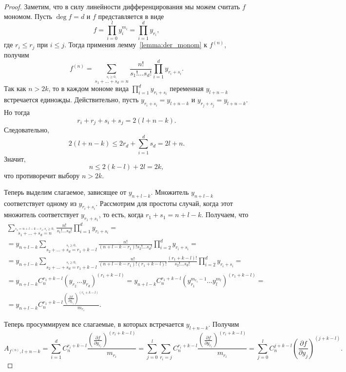 \documentclass[16pt]{article}
\theoremstyle{plain}
\theoremstyle{definition}
\theoremstyle{remark}
\begin{document}
\begin{proof}
Заметим, что в силу линейности дифференцирования мы можем считать
$f$ мономом. Пусть $\deg f = d$ и $f$ представляется в
виде
$$
f=\prod\limits_{i=0}^ly_i^{m_i}=\prod\limits_{i=1}^{d}y_{r_i},
$$
где $r_i\leqslant r_j$ при $i \leqslant j$. Тогда применив лемму~\ref{lemma:der_monom} к $f^{(n)}$,
получим
$$
f^{(n)}=\sum\limits_{\stackrel{s_i\geqslant0,}{
s_1+\ldots+s_d=n}}\frac{n!}{s_1!\ldots s_d!}
\prod\limits_{i=1}^dy_{r_i+s_i}.
$$
Так как $n>2k$, то в каждом мономе вида $\prod_{i=1}^d y_{r_i+s_i}$
переменная $y_{l+n-k}$ встречается единожды. Действительно, пусть
$y_{r_i+s_i}=y_{l+n-k}$ и $y_{r_j+s_j}=y_{l+n-k}$. Но тогда
$$
r_i+r_j +s_i+s_j = 2(l+n-k).
$$
Следовательно,
$$
2(l+n-k)\leqslant 2r_d + \sum_{i=1}^d s_d = 2l +n.
$$
Значит,
$$
n \leqslant 2(k-l) + 2l =2k,
$$
что противоречит выбору $n>2k$.


Теперь выделим слагаемое, зависящее от $y_{n+l-k}$. Множитель
$y_{n+l-k}$ соответствует одному из $y_{r_i+s_i}$. Рассмотрим для
простоты случай, когда этот множитель соответствует $y_{r_1+s_1}$,
то есть, когда $r_1+s_1 = n+l-k$. Получаем, что
\begin{gather*}
\sum\limits_{\stackrel{s_1 =n+l-k-r_1,
s_i\geqslant0,}{s_1+\ldots+s_d=n}}\frac{n!}{s_1!\ldots s_d!}\prod\limits_{i=1}^dy_{r_i+s_i}=\\
=y_{n+l-k}\sum\limits_{\stackrel{
s_i\geqslant0,}{s_2+\ldots+s_d=r_1+k-l}}\frac{n!}{(n+l-k-r_1)!s_2!\ldots s_d!}\prod\limits_{i=2}^dy_{r_i+s_i}=\\
=y_{n+l-k}\sum\limits_{\stackrel{
s_i\geqslant0,}{s_2+\ldots+s_d=r_1+k-l}}\frac{n!}{(n+l-k-r_1)!(r_1+k-l)!}\frac{(r_1+k-l)!}{s_2!\ldots s_d!}\prod\limits_{i=2}^dy_{r_i+s_i}=\\
=y_{n+l-k}C_n^{r_1+k-l} (y_{r_2}\ldots y_{r_d})^{(r_1+k-l)} =
y_{n+l-k}C_n^{r_1+k-l}(y_{r_1}^{m_{r_1}-1}\ldots
y_{l}^{m_l})^{(r_1+k-l)}=\\
=y_{n+l-k}C_n^{r_1+k-l}\frac{\left(\frac{\partial f}{\partial
y_{r_1}}\right)^{(r_1+k -l)}}{m_{r_1}}.
\end{gather*}

Теперь просуммируем все слагаемые, в которых встречается
$y_{l+n-k}$. Получим
$$
A_{f^{(n)},l+n-k} = \sum_{i=1}^{d}
C_n^{r_i+k-l}\frac{\left(\frac{\partial f}{\partial
y_{r_i}}\right)^{(r_i+k -l)}}{m_{r_i}}= \sum_{j=0}^l \sum_{r_i = j}
C_n^{r_i+k-l}\frac{\left(\frac{\partial f}{\partial
y_{r_i}}\right)^{(r_i+k -l)}}{m_{r_i}} = \sum_{j=0}^l C_n^{j+k-l}
\left(\frac{\partial f}{\partial y_{j}}\right)^{(j+k-l)}.
$$
\end{proof}
\end{document}
